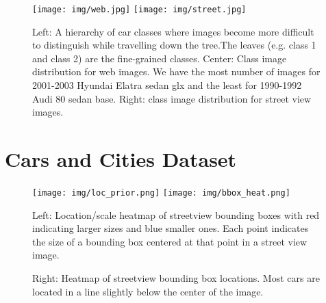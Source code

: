 \documentclass[10pt,twocolumn,letterpaper]{article}
\begin{document}

\begin{figure} [t]
\begin{center}
\texttt{[image: img/web.jpg]}
\texttt{[image: img/street.jpg]}
\end{center}
\caption {Left: A hierarchy of car classes where images become more difficult to distinguish while travelling down the tree.The leaves (e.g. class 1 and class 2) are the fine-grained classes. Center: Class image distribution for web images. We have the most number of images for 2001-2003 Hyundai Elatra sedan glx and the least for 1990-1992 Audi 80 sedan base. Right: class image distribution for street view images.}
\label{fig:img_dist}
\end{figure}

\section{Cars and Cities Dataset}
\label{sec:data}
\begin{figure}[t]
\begin{center}
   \texttt{[image: img/loc\_prior.png]}
   \texttt{[image: img/bbox\_heat.png]}
\end{center}
   \caption{Left: Location/scale heatmap of streetview bounding boxes with red indicating larger sizes and blue smaller ones. Each point indicates the size of a bounding box centered at that point in a street view image.}
   \caption{Right: Heatmap of streetview bounding box locations. Most cars are located in a line slightly below the center of the image.}
\label{fig:loc-heat}
\end{figure}
\end{document}
